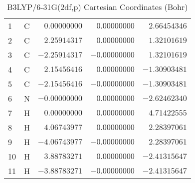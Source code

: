 \documentclass[10pt,oneside]{article}
\begin{document}
\begin{table}[h!]
\centering
\caption{B3LYP/6-31G(2df,p) Cartesian Coordinates (Bohr)}
\begin{tabular}{llrrr}
1  & C  & $ 0.00000000$ & $ 0.00000000$ & $ 2.66454346$ \\
2  & C  & $ 2.25914317$ & $ 0.00000000$ & $ 1.32101619$ \\
3  & C  & $-2.25914317$ & $-0.00000000$ & $ 1.32101619$ \\
4  & C  & $ 2.15456416$ & $ 0.00000000$ & $-1.30903481$ \\
5  & C  & $-2.15456416$ & $-0.00000000$ & $-1.30903481$ \\
6  & N  & $-0.00000000$ & $ 0.00000000$ & $-2.62462340$ \\
7  & H  & $ 0.00000000$ & $ 0.00000000$ & $ 4.71422555$ \\
8  & H  & $ 4.06743977$ & $ 0.00000000$ & $ 2.28397061$ \\
9  & H  & $-4.06743977$ & $-0.00000000$ & $ 2.28397061$ \\
10 & H  & $ 3.88783271$ & $ 0.00000000$ & $-2.41315647$ \\
11 & H  & $-3.88783271$ & $-0.00000000$ & $-2.41315647$ \\
\end{tabular}
\end{table}

\clearpage
\end{document}
